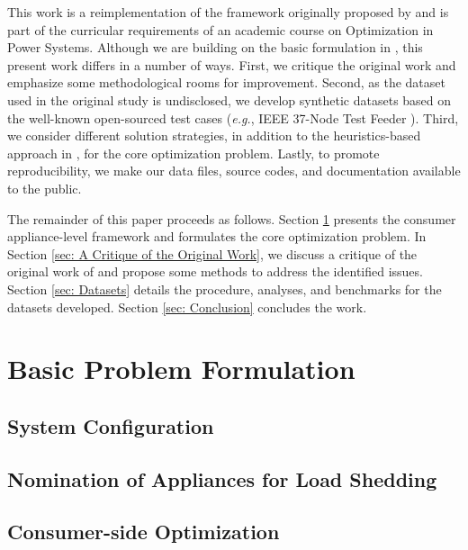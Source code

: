 \documentclass[journal, a4paper]{IEEEtran}
\begin{document}
This work is a reimplementation of the framework originally proposed by \cite{Jabian2020}
and is part of the curricular requirements of an academic course on Optimization in Power Systems.
Although we are building on the basic formulation in \cite{Jabian2020},
this present work differs in a number of ways.
First, we critique the original work and emphasize some methodological rooms for improvement.
Second, as the dataset used in the original study is undisclosed,
we develop synthetic datasets based on the well-known open-sourced test cases
(\textit{e.g.}, IEEE 37-Node Test Feeder \cite{Kersting2001}).
Third, we consider different solution strategies,
in addition to the heuristics-based approach in \cite{Jabian2020},
for the core optimization problem.
Lastly, to promote reproducibility, we make our data files, source codes, and documentation available to the public.

The remainder of this paper proceeds as follows.
Section \ref{sec: Basic Problem Formulation} presents the consumer appliance-level framework
and formulates the core optimization problem.
In Section \ref{sec: A Critique of the Original Work}, we discuss a critique of the original work of \cite{Jabian2020}
and propose some methods to address the identified issues.
Section \ref{sec: Datasets} details the procedure, analyses, and benchmarks for the datasets developed.
Section \ref{sec: Conclusion} concludes the work.

\section{Basic Problem Formulation}
\label{sec: Basic Problem Formulation}


\lipsum[8]

\subsection{System Configuration}
\label{subsec: I. System Configuration}

\subsection{Nomination of Appliances for Load Shedding}
\label{subsec: I. Nomination of Appliances for Load Shedding}

\subsection{Consumer-side Optimization}
\label{subsec: I. Consumer-side Optimization}
\end{document}
